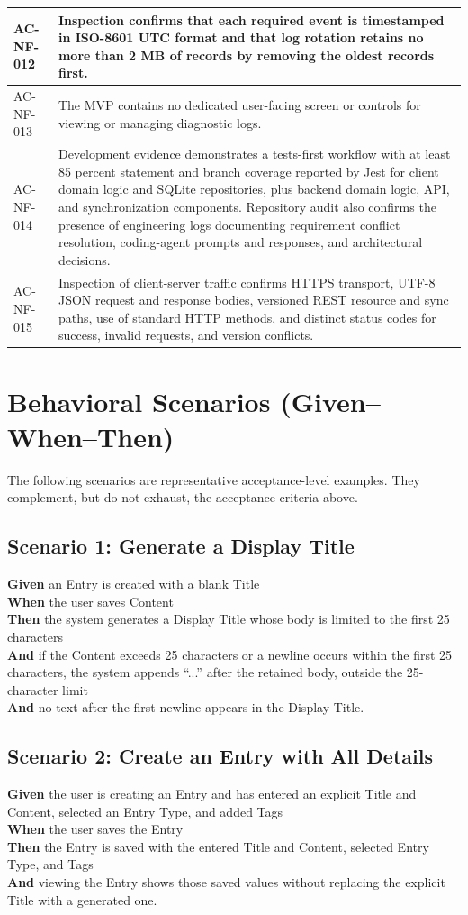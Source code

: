 \documentclass[11pt,a4paper]{article}
\begin{document}
\begin{longtable}{|L{2.5cm}|L{13.5cm}|}
AC-NF-012 & Inspection confirms that each required event is timestamped in ISO-8601 UTC format and that log rotation retains no more than 2 MB of records by removing the oldest records first. \\ \hline
AC-NF-013 & The MVP contains no dedicated user-facing screen or controls for viewing or managing diagnostic logs. \\ \hline
AC-NF-014 & Development evidence demonstrates a tests-first workflow with at least 85 percent statement and branch coverage reported by Jest for client domain logic and SQLite repositories, plus backend domain logic, API, and synchronization components. Repository audit also confirms the presence of engineering logs documenting requirement conflict resolution, coding-agent prompts and responses, and architectural decisions. \\ \hline
AC-NF-015 & Inspection of client-server traffic confirms HTTPS transport, UTF-8 JSON request and response bodies, versioned REST resource and sync paths, use of standard HTTP methods, and distinct status codes for success, invalid requests, and version conflicts. \\ \hline
\end{longtable}

\section{Behavioral Scenarios (Given--When--Then)}
The following scenarios are representative acceptance-level examples. They complement, but do not exhaust, the acceptance criteria above.

\subsection*{Scenario 1: Generate a Display Title}
\textbf{Given} an Entry is created with a blank Title\\
\textbf{When} the user saves Content\\
\textbf{Then} the system generates a Display Title whose body is limited to the first 25 characters\\
\textbf{And} if the Content exceeds 25 characters or a newline occurs within the first 25 characters, the system appends ``...'' after the retained body, outside the 25-character limit\\
\textbf{And} no text after the first newline appears in the Display Title.

\subsection*{Scenario 2: Create an Entry with All Details}
\textbf{Given} the user is creating an Entry and has entered an explicit Title and Content, selected an Entry Type, and added Tags\\
\textbf{When} the user saves the Entry\\
\textbf{Then} the Entry is saved with the entered Title and Content, selected Entry Type, and Tags\\
\textbf{And} viewing the Entry shows those saved values without replacing the explicit Title with a generated one.
\end{document}

